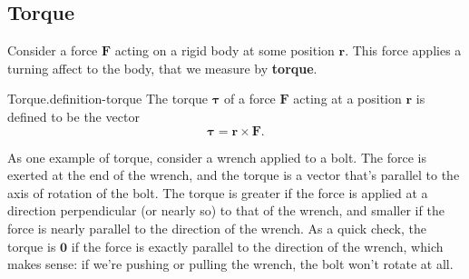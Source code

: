 \documentclass[10pt,]{book}
\newcommand{\terminology}[1]{\textbf{#1}}
\numberwithin{equation}{section}
\newcommand{\vv}[1]{\mathbf{#1}}
\begin{document}
\subsection[{Torque}]{Torque}\label{subsection-torque}
\hypertarget{p-1191}{}%
Consider a force \(\vv{F}\) acting on a rigid body at some position \(\vv{r}\). This force applies a turning affect to the body, that we measure by \terminology{torque}.%
\begin{definition}{Torque.}{definition-torque}%
\hypertarget{p-1192}{}%
The torque \(\boldsymbol{\tau}\) of a force \(\vv{F}\) acting at a position \(\vv{r}\) is defined to be the vector%
%
\begin{equation*}
\boldsymbol{\tau} = \vv{r}\times\vv{F}.
\end{equation*}
\end{definition}
\hypertarget{p-1193}{}%
As one example of torque, consider a wrench applied to a bolt. The force is exerted at the end of the wrench, and the torque is a vector that's parallel to the axis of rotation of the bolt. The torque is greater if the force is applied at a direction perpendicular (or nearly so) to that of the wrench, and smaller if the force is nearly parallel to the direction of the wrench. As a quick check, the torque is \(\vv{0}\) if the force is exactly parallel to the direction of the wrench, which makes sense: if we're pushing or pulling the wrench, the bolt won't rotate at all.%
\end{document}
